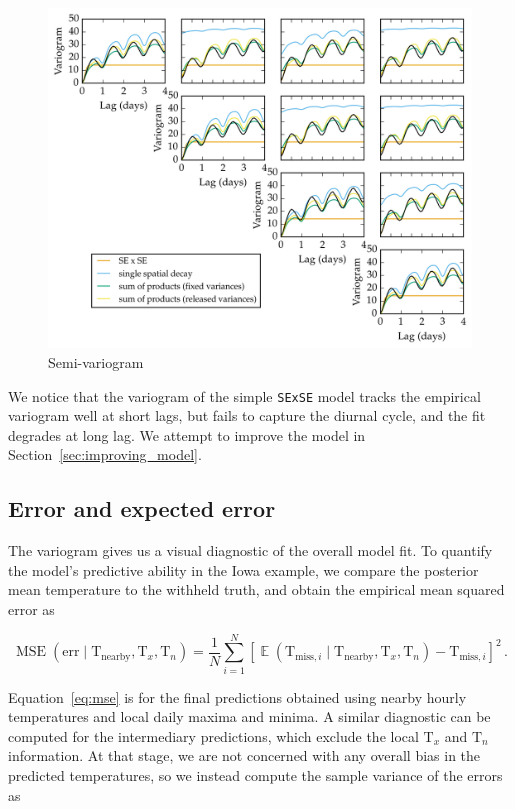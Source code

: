\documentclass[letter]{article}
\makeatletter
\def\maxwidth{\ifdim\Gin@nat@width>\linewidth\linewidth
\else\Gin@nat@width\fi}
\let\Oldincludegraphics\includegraphics
\renewcommand{\includegraphics}[1]{\Oldincludegraphics[width=0.98\maxwidth]{#1}}
\newcommand{\genericdel}[3]{%
      \left#1#3\right#2
    }
\newcommand{\del}[1]{\genericdel(){#1}}
\newcommand{\sbr}[1]{\genericdel[]{#1}}
\DeclareMathOperator{\E}{\mathbb{E}}
\DeclareMathOperator{\mse}{{MSE}}
\newcommand{\T}{\mathrm{T}}
\newcommand{\Tn}{\T_{n}}
\newcommand{\Tx}{\T_{x}}
\newcommand{\miss}{\mathrm{miss}}
\newcommand{\obs}{\mathrm{nearby}}
\newcommand{\error}{\mathrm{err}}
\makeatother
\begin{document}
\begin{figure}
\centering
\includegraphics{../figures/spatial_variogram.png}
\caption{\label{fig:spatial_variogram} Semi-variogram}
\end{figure}
    


        We notice that the variogram of the simple \texttt{SExSE} model tracks the empirical variogram well at short lags, but fails to capture the diurnal cycle, and the fit degrades at long lag. We attempt to improve the model in Section~\ref{sec:improving_model}.
    


        \subsection{Error and expected error}\label{error-and-expected-error}

The variogram gives us a visual diagnostic of the overall model fit. To quantify the model's predictive ability in the Iowa example, we compare the posterior mean temperature to the withheld truth, and obtain the empirical mean squared error as

\begin{equation}
    \label{eq:mse}
    \mse\del{\error \mid \T_\obs,\Tx,\Tn} = \frac{1}{N} \sum_{i=1}^N \sbr{\E\del{\T_{\miss,i} \mid \T_\obs,\Tx,\Tn} - \T_{\miss,i}}^2\,.
\end{equation}

Equation~\eqref{eq:mse} is for the final predictions obtained using nearby hourly temperatures and local daily maxima and minima.
A similar diagnostic can be computed for the intermediary predictions, which exclude the local \(\Tx\) and \(\Tn\) information.
At that stage, we are not concerned with any overall bias in the predicted temperatures, so we instead compute the sample variance of the errors as
\end{document}
